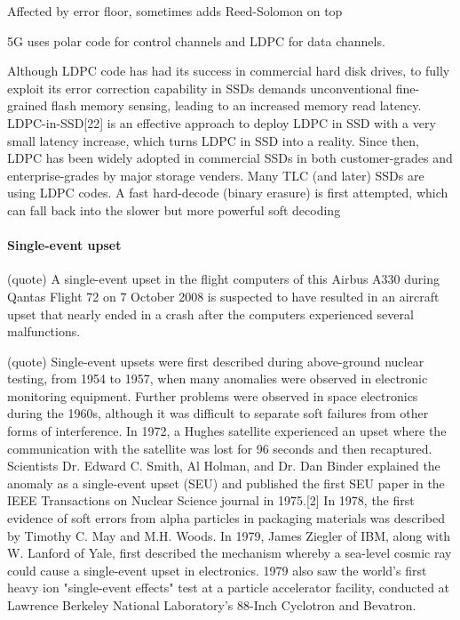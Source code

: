 \documentclass{article}
\begin{document}
Affected by error floor, sometimes adds Reed-Solomon on top

5G uses polar code for control channels and LDPC for data channels.

Although LDPC code has had its success in commercial hard disk drives, to fully exploit its error correction capability in SSDs demands unconventional fine-grained flash memory sensing, leading to an increased memory read latency. LDPC-in-SSD[22] is an effective approach to deploy LDPC in SSD with a very small latency increase, which turns LDPC in SSD into a reality. Since then, LDPC has been widely adopted in commercial SSDs in both customer-grades and enterprise-grades by major storage venders. Many TLC (and later) SSDs are using LDPC codes. A fast hard-decode (binary erasure) is first attempted, which can fall back into the slower but more powerful soft decoding

\paragraph{Single-event upset}

(quote) A single-event upset in the flight computers of this Airbus A330 during Qantas Flight 72 on 7 October 2008 is suspected to have resulted in an aircraft upset that nearly ended in a crash after the computers experienced several malfunctions.

(quote) Single-event upsets were first described during above-ground nuclear testing, from 1954 to 1957, when many anomalies were observed in electronic monitoring equipment. Further problems were observed in space electronics during the 1960s, although it was difficult to separate soft failures from other forms of interference. In 1972, a Hughes satellite experienced an upset where the communication with the satellite was lost for 96 seconds and then recaptured. Scientists Dr. Edward C. Smith, Al Holman, and Dr. Dan Binder explained the anomaly as a single-event upset (SEU) and published the first SEU paper in the IEEE Transactions on Nuclear Science journal in 1975.[2] In 1978, the first evidence of soft errors from alpha particles in packaging materials was described by Timothy C. May and M.H. Woods. In 1979, James Ziegler of IBM, along with W. Lanford of Yale, first described the mechanism whereby a sea-level cosmic ray could cause a single-event upset in electronics. 1979 also saw the world's first heavy ion "single-event effects" test at a particle accelerator facility, conducted at Lawrence Berkeley National Laboratory's 88-Inch Cyclotron and Bevatron.
\end{document}
